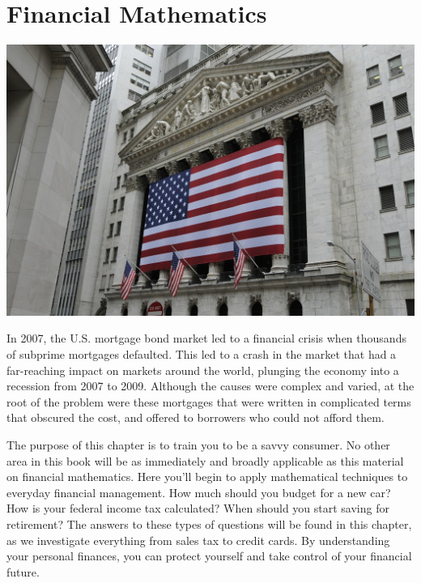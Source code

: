 \documentclass[9pt,letter,twoside,openright]{memoir}
\begin{document}
\frontmatter
{}
\pagestyle{empty}
\titleBC
\frontmatter


\setcounter{tocdepth}{1}
\tableofcontents*
\mainmatter
\restoregeometry
\pagestyle{doc}

\chapter{Financial Mathematics}
\begin{center}\includegraphics[width=\textwidth]{NYSE}\end{center}

In 2007, the U.S. mortgage bond market led to a financial crisis when thousands of subprime mortgages defaulted.  This led to a crash in the market that had a far-reaching impact on markets around the world, plunging the economy into a recession from 2007 to 2009.  Although the causes were complex and varied, at the root of the problem were these mortgages that were written in complicated terms that obscured the cost, and offered to borrowers who could not afford them.

The purpose of this chapter is to train you to be a savvy consumer.  No other area in this book will be as immediately and broadly applicable as this material on financial mathematics.  Here you'll begin to apply mathematical techniques to everyday financial management.  How much should you budget for a new car?  How is your federal income tax calculated?  When should you start saving for retirement?  The answers to these types of questions will be found in this chapter, as we investigate everything from sales tax to credit cards.  By understanding your personal finances, you can protect yourself and take control of your financial future.
\vfill
\pagebreak
\end{document}
